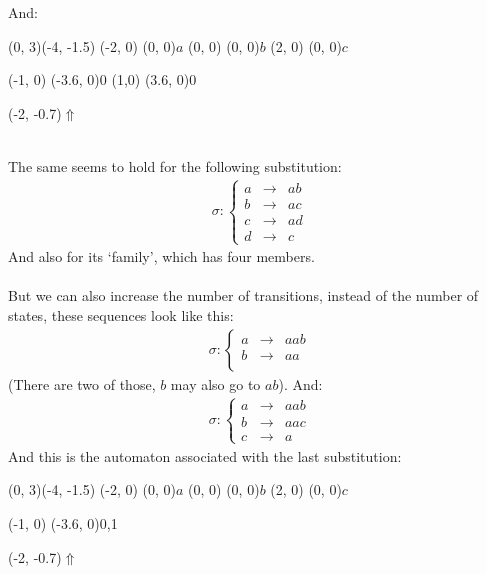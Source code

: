 \documentclass{article}
\begin{document}
And:\\
\begin{graph}(0, 3)(-4, -1.5)
  (-2, 0) (0, 0){$a$}
  (0, 0)  (0, 0){$b$}
  (2, 0)  (0, 0){$c$}

  (-1, 0) \freetext(-3.6, 0){0}
   
   
   
  (1,0) \freetext(3.6, 0){0}

  \freetext(-2, -0.7){$\Uparrow$}
\end{graph}\\
The same seems to hold for the following substitution:
\begin{eqnarray*}
\sigma: \left\{ \begin{array}{lll}
a &\rightarrow& ab\\
b &\rightarrow& ac\\
c &\rightarrow& ad\\
d &\rightarrow& c
\end{array} \right.
\end{eqnarray*}
And also for its `family', which has four members.\\
\\
But we can also increase the number of transitions, instead of the number of
states, these sequences look like this:\\
\begin{eqnarray*}
\sigma: \left\{ \begin{array}{lll}
a &\rightarrow& aab\\
b &\rightarrow& aa\\
\end{array} \right.
\end{eqnarray*}
(There are two of those, $b$ may also go to $ab$). And:
\begin{eqnarray*}
\sigma: \left\{ \begin{array}{lll}
a &\rightarrow& aab\\
b &\rightarrow& aac\\
c &\rightarrow& a
\end{array} \right.
\end{eqnarray*}
And this is the automaton associated with the last substitution:\\
\begin{graph}(0, 3)(-4, -1.5)
  (-2, 0) (0, 0){$a$}
  (0, 0)  (0, 0){$b$}
  (2, 0)  (0, 0){$c$}

  (-1, 0) \freetext(-3.6, 0){0,1}
   
   
   
   

  \freetext(-2, -0.7){$\Uparrow$}
\end{graph}\\
\end{document}

